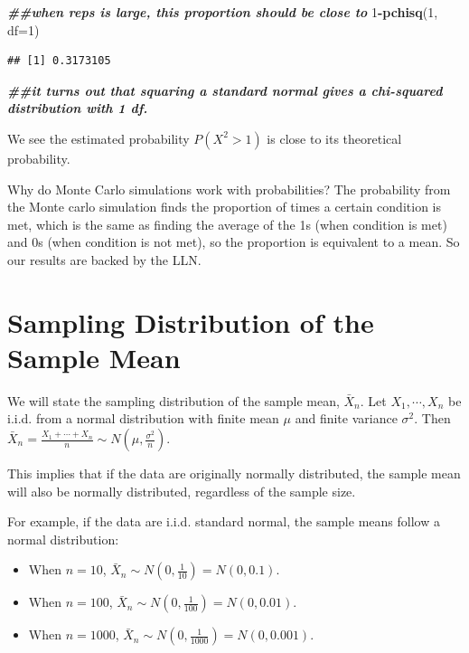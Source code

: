 \documentclass[
]{book}
\newenvironment{Shaded}{\begin{snugshade}}{\end{snugshade}}
\newcommand{\AttributeTok}[1]{\textcolor[rgb]{0.13,0.29,0.53}{#1}}
\newcommand{\DecValTok}[1]{\textcolor[rgb]{0.00,0.00,0.81}{#1}}
\newcommand{\DocumentationTok}[1]{\textcolor[rgb]{0.56,0.35,0.01}{\textbf{\textit{#1}}}}
\newcommand{\FunctionTok}[1]{\textcolor[rgb]{0.13,0.29,0.53}{\textbf{#1}}}
\newcommand{\NormalTok}[1]{#1}
\newcommand{\SpecialCharTok}[1]{\textcolor[rgb]{0.81,0.36,0.00}{\textbf{#1}}}
\providecommand{\tightlist}{%
  \setlength{\itemsep}{0pt}\setlength{\parskip}{0pt}}
\theoremstyle{definition}
\theoremstyle{definition}
\theoremstyle{definition}
\theoremstyle{definition}
\theoremstyle{remark}
\begin{document}
\begin{Shaded}
\begin{Highlighting}[]
\DocumentationTok{\#\#when reps is large, this proportion should be close to}
\DecValTok{1}\SpecialCharTok{{-}}\FunctionTok{pchisq}\NormalTok{(}\DecValTok{1}\NormalTok{, }\AttributeTok{df=}\DecValTok{1}\NormalTok{)}
\end{Highlighting}
\end{Shaded}

\begin{verbatim}
## [1] 0.3173105
\end{verbatim}

\begin{Shaded}
\begin{Highlighting}[]
\DocumentationTok{\#\#it turns out that squaring a standard normal gives a chi{-}squared distribution with 1 df.}
\end{Highlighting}
\end{Shaded}

We see the estimated probability \(P(X^2 > 1)\) is close to its theoretical probability.

Why do Monte Carlo simulations work with probabilities? The probability from the Monte carlo simulation finds the proportion of times a certain condition is met, which is the same as finding the average of the 1s (when condition is met) and 0s (when condition is not met), so the proportion is equivalent to a mean. So our results are backed by the LLN.

\hypertarget{distsampmean}{%
\section{Sampling Distribution of the Sample Mean}\label{distsampmean}}

We will state the sampling distribution of the sample mean, \(\bar{X}_n\). Let \(X_1, \cdots, X_n\) be i.i.d. from a normal distribution with finite mean \(\mu\) and finite variance \(\sigma^2\). Then \(\bar{X}_n = \frac{X_1 + \cdots + X_n}{n} \sim N(\mu, \frac{\sigma^2}{n})\).

This implies that if the data are originally normally distributed, the sample mean will also be normally distributed, regardless of the sample size.

For example, if the data are i.i.d. standard normal, the sample means follow a normal distribution:

\begin{itemize}
\tightlist
\item
  When \(n=10\), \(\bar{X}_n \sim N(0, \frac{1}{10}) = N(0, 0.1)\).
\item
  When \(n=100\), \(\bar{X}_n \sim N(0, \frac{1}{100}) = N(0,0.01)\).
\item
  When \(n=1000\), \(\bar{X}_n \sim N(0, \frac{1}{1000}) = N(0,0.001)\).
\end{itemize}
\end{document}
